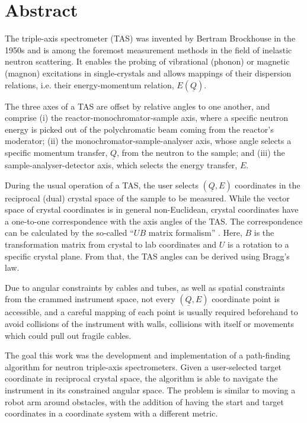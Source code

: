 %
%

\chapter*{Abstract}

The triple-axis spectrometer (TAS) \cite{Shirane2002} was invented by Bertram Brockhouse in the 1950s and
is among the foremost measurement methods in the field of inelastic neutron scattering. 
It enables the probing of vibrational (phonon) or magnetic (magnon) excitations in single-crystals and allows 
mappings of their dispersion relations, i.e. their energy-momentum relation, $E\left( \underline{Q} \right)$.

The three axes of a TAS are offset by relative angles to one another, and comprise 
(i) the reactor-monochromator-sample axis, where a specific neutron energy is picked out of the polychromatic 
beam coming from the reactor's moderator; 
(ii) the monochromator-sample-analyser axis, whose angle selects a specific momentum transfer, $\underline{Q}$, 
from the neutron to the sample; and 
(iii) the sample-analyser-detector axis, which selects the energy transfer, $E$.

During the usual operation of a TAS, the user selects $\left( \underline{Q}, E \right)$ coordinates in the reciprocal (dual)
crystal space of the sample to be measured. While the vector space of crystal coordinates 
is in general non-Euclidean, crystal coordinates have a one-to-one correspondence with the axis angles 
of the TAS. The correspondence can be calculated by the so-called ``$UB$ matrix formalism'' \cite{Lumsden2005}. 
Here, $B$ is the transformation matrix from crystal to lab coordinates and $U$ is a rotation to a specific 
crystal plane. From that, the TAS angles can be derived using Bragg's law.

Due to angular constraints by cables and tubes, as well as spatial constraints from the crammed instrument space, 
not every $\left( \underline{Q}, E \right)$ coordinate point is accessible, and a careful mapping of each point is
usually required beforehand to avoid collisions of the instrument with walls, collisions with itself or movements
which could pull out fragile cables.

The goal this work was the development and implementation of a path-finding algorithm for
neutron triple-axis spectrometers. Given a user-selected target coordinate in reciprocal crystal space, 
the algorithm is able to navigate the instrument in its constrained angular space. The problem is similar to
moving a robot arm around obstacles, with the addition of having the start and target coordinates in a 
coordinate system with a different metric.

